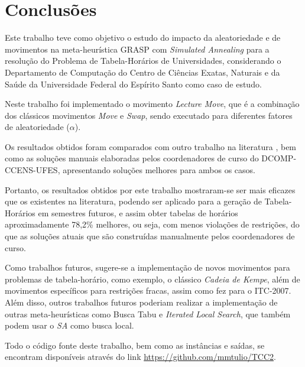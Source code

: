 \chapter{Conclusões}
\label{sec-conclusoes}

Este trabalho teve como objetivo o estudo do impacto da aleatoriedade e de movimentos na meta-heurística GRASP com \textit{Simulated Annealing} para a resolução do Problema de Tabela-Horários de Universidades, considerando o Departamento de Computação do Centro de Ciências Exatas, Naturais e da Saúde da Universidade Federal do Espírito Santo como caso de estudo.

Neste trabalho foi implementado o movimento \textit{Lecture Move}, que é a combinação dos clássicos movimentos \textit{Move} e \textit{Swap}, sendo executado para diferentes fatores de aleatoriedade (\(\alpha\)).

Os resultados obtidos foram comparados com outro trabalho na literatura \cite{vital2015grasp}, bem como as soluções manuais elaboradas pelos coordenadores de curso do DCOMP-CCENS-UFES, apresentando soluções melhores para ambos os casos.

Portanto, os resultados obtidos por este trabalho mostraram-se ser mais eficazes que os existentes na literatura, podendo ser aplicado para a geração de Tabela-Horários em semestres futuros, e assim obter tabelas de horários aproximadamente 78,2\% melhores, ou seja, com menos violações de restrições, do que as soluções atuais que são construídas manualmente pelos coordenadores de curso.

Como trabalhos futuros, sugere-se a implementação de novos movimentos para problemas de tabela-horário, como exemplo, o clássico \textit{Cadeia de Kempe}, além de movimentos específicos para restrições fracas, assim como  fez para o ITC-2007.
Além disso, outros trabalhos futuros poderiam realizar a implementação de outras meta-heurísticas como Busca Tabu e \textit{Iterated Local Search}, que também podem usar o \textit{SA} como busca local.

Todo o código fonte deste trabalho, bem como as instâncias e saídas, se encontram disponíveis através do link \href{https://github.com/mmtulio/TCC2}{https://github.com/mmtulio/TCC2}.